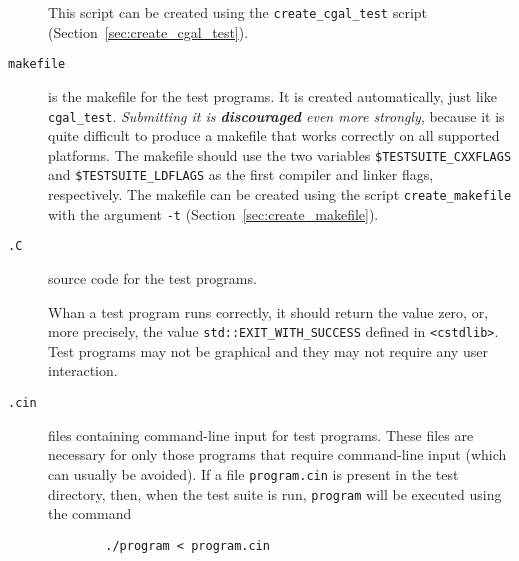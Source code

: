 \begin{description}
        This script can be created using the 
        {\tt create\_cgal\_test}%
        script (Section~\ref{sec:create_cgal_test}).  

   \item[{\tt makefile}] 
        is the makefile for the test programs. It is created
        automatically, just like {\tt cgal\_test}. {\em Submitting it is 
        {\bf discouraged} even more strongly}, because it is quite difficult 
        to produce a makefile that works correctly on all supported platforms.
        The makefile should use
        the two variables \verb|$TESTSUITE_CXXFLAGS| 
        and \verb|$TESTSUITE_LDFLAGS| 
        as the first compiler and linker flags,
        respectively.  The makefile can be created using the script
        {\tt create\_makefile}%
        with the argument {\tt -t} 
        (Section~\ref{sec:create_makefile}).
   \item[{\tt *.C}] source code for the test programs.

        Whan a test program runs correctly, it should return
         the
	value zero, or, more precisely, the value \verb|std::EXIT_WITH_SUCCESS|
        defined in \verb|<cstdlib>|.
        Test programs may not be graphical and they may not require any user 
        interaction.   
   \item[{\tt *.cin}] files containing command-line input for 
        test programs.  These files are necessary for only those programs 
        that require command-line input (which can usually be avoided).  
        If a file \texttt{program.cin} is 
        present in the test directory, then, when the test suite is run,
        \texttt{program} will be executed using the command
        \begin{verbatim}
        ./program < program.cin
        \end{verbatim}
\end{description} 

